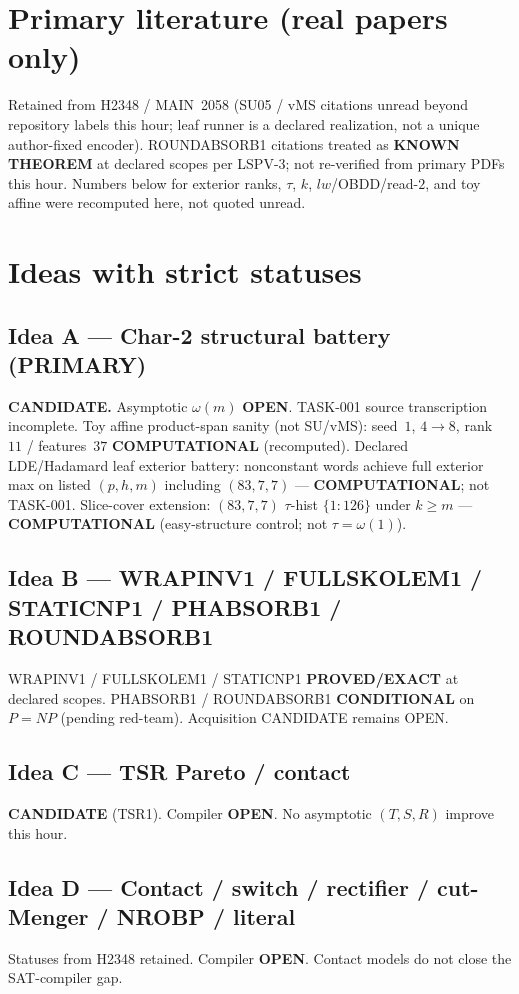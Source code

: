 \documentclass[11pt]{article}
\begin{document}
\section*{Primary literature (real papers only)}
Retained from H2348 / MAIN~2058 (SU05 / vMS citations unread beyond repository labels this hour;
leaf runner is a declared realization, not a unique author-fixed encoder).
ROUNDABSORB1 citations treated as \textbf{KNOWN THEOREM} at declared scopes per LSPV-3;
not re-verified from primary PDFs this hour.
Numbers below for exterior ranks, $\tau$, $k$, $lw$/OBDD/read-$2$, and toy affine
were recomputed here, not quoted unread.

\section*{Ideas with strict statuses}
\subsection*{Idea A --- Char-2 structural battery (PRIMARY)}
\textbf{CANDIDATE.} Asymptotic $\omega(m)$ \textbf{OPEN}. TASK-001 source transcription incomplete.
Toy affine product-span sanity (not SU/vMS): seed~$1$, $4\to8$, rank~$11$ / features~$37$
\textbf{COMPUTATIONAL} (recomputed).
Declared LDE/Hadamard leaf exterior battery: nonconstant words achieve full exterior max on
listed $(p,h,m)$ including $(83,7,7)$ --- \textbf{COMPUTATIONAL}; not TASK-001.
Slice-cover extension: $(83,7,7)$ $\tau$-hist $\{1{:}126\}$ under $k{\ge}m$ ---
\textbf{COMPUTATIONAL} (easy-structure control; not $\tau=\omega(1)$).

\subsection*{Idea B --- WRAPINV1 / FULLSKOLEM1 / STATICNP1 / PHABSORB1 / ROUNDABSORB1}
WRAPINV1 / FULLSKOLEM1 / STATICNP1 \textbf{PROVED/EXACT} at declared scopes.
PHABSORB1 / ROUNDABSORB1 \textbf{CONDITIONAL} on $P=NP$ (pending red-team). Acquisition CANDIDATE remains OPEN.

\subsection*{Idea C --- TSR Pareto / contact}
\textbf{CANDIDATE} (TSR1). Compiler \textbf{OPEN}. No asymptotic $(T,S,R)$ improve this hour.

\subsection*{Idea D --- Contact / switch / rectifier / cut-Menger / NROBP / literal}
Statuses from H2348 retained. Compiler \textbf{OPEN}. Contact models do not close the SAT-compiler gap.
\end{document}
